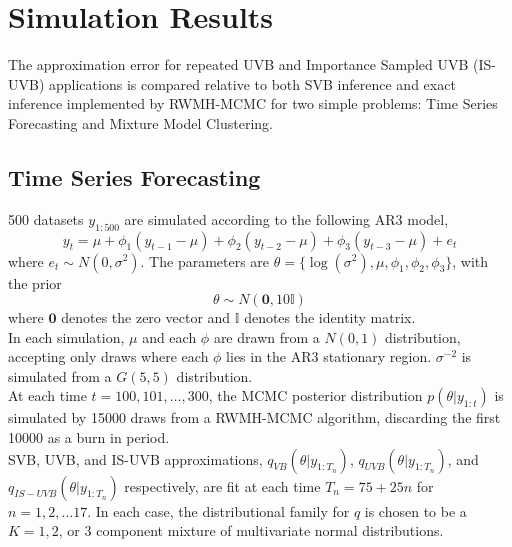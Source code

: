 \documentclass[
12pt, %
onehalfspacing, %
nohyperref, %
headsepline, %
chapterinoneline, %
]{MastersDoctoralThesis} %
\begin{document}
\section{Simulation Results}
\label{sec:UVBSim}

The approximation error for repeated UVB and Importance Sampled UVB (IS-UVB) applications is compared relative to both SVB inference and exact inference implemented by RWMH-MCMC for two simple problems: Time Series Forecasting and Mixture Model Clustering.

\subsection{Time Series Forecasting}
\label{subsec:UVBTS}

500 datasets $y_{1:500}$ are simulated according to the following AR3 model,
\begin{equation}
\label{UVB:TSAR3}
y_t = \mu + \phi_1 (y_{t-1} - \mu) + \phi_2 (y_{t-2} - \mu) + \phi_3 (y_{t-3} - \mu) + e_t
\end{equation}
where $e_t \sim N(0, \sigma^2)$. 
The parameters are $\theta = \{\log(\sigma^2), \mu, \phi_1, \phi_2, \phi_3 \}$, with the prior
\begin{equation}
\label{UVB:TSprior}
\theta \sim N(\boldsymbol{0}, 10 \mathbb{I})
\end{equation}
where $\boldsymbol{0}$ denotes the zero vector and $\mathbb{I}$ denotes the identity matrix.
\\

In each simulation, $\mu$ and each $\phi$ are drawn from a $N(0, 1)$ distribution, accepting only draws where each $\phi$ lies in the AR3 stationary region. $\sigma^{-2}$ is simulated from a $G(5, 5)$ distribution.
\\

At each time $t = 100, 101, \ldots, 300$, the MCMC posterior distribution $p(\theta | y_{1:t})$ is simulated by 15000 draws from a RWMH-MCMC algorithm, discarding the first 10000 as a burn in period.
\\

SVB, UVB, and IS-UVB approximations, $q_{VB}(\theta | y_{1:T_n})$, $q_{UVB}(\theta | y_{1:T_n})$, and $q_{IS-UVB}(\theta | y_{1:T_n})$ respectively, are fit at each time $T_n = 75 + 25n$ for $n = 1, 2, \ldots 17$. In each case, the distributional family for $q$ is chosen to be a $K = 1, 2$, or $3$ component mixture of multivariate normal distributions.
\\
\end{document}
